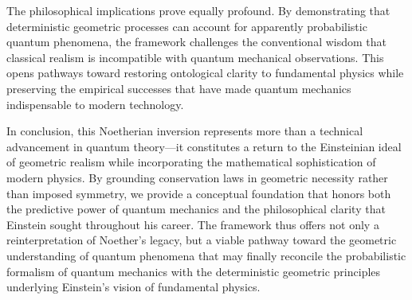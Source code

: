 \documentclass[%
 reprint,
 amsmath,amssymb,
 aps,
]{revtex4-1}
\numberwithin{equation}{section}%
\begin{document}
The philosophical implications prove equally profound. By demonstrating that deterministic geometric processes can account for apparently probabilistic quantum phenomena, the framework challenges the conventional wisdom that classical realism is incompatible with quantum mechanical observations. This opens pathways toward restoring ontological clarity to fundamental physics while preserving the empirical successes that have made quantum mechanics indispensable to modern technology.

In conclusion, this Noetherian inversion represents more than a technical advancement in quantum theory—it constitutes a return to the Einsteinian ideal of geometric realism while incorporating the mathematical sophistication of modern physics. By grounding conservation laws in geometric necessity rather than imposed symmetry, we provide a conceptual foundation that honors both the predictive power of quantum mechanics and the philosophical clarity that Einstein sought throughout his career. The framework thus offers not only a reinterpretation of Noether's legacy, but a viable pathway toward the geometric understanding of quantum phenomena that may finally reconcile the probabilistic formalism of quantum mechanics with the deterministic geometric principles underlying Einstein's vision of fundamental physics.
\end{document}
